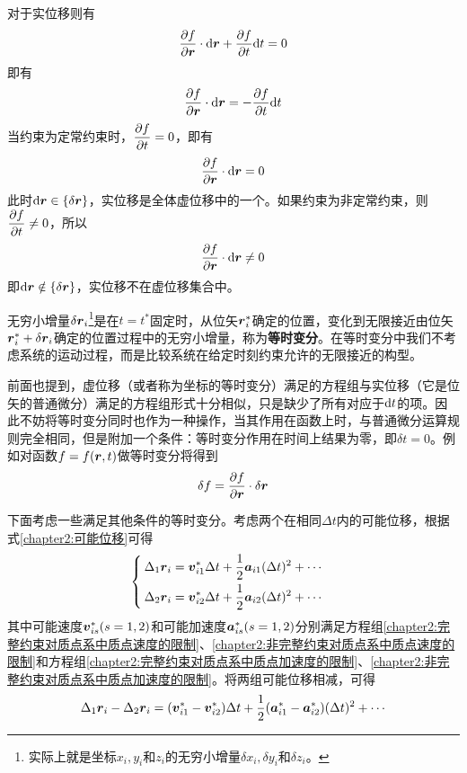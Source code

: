 \begin{example}
对于实位移则有
\begin{equation*}
	\frac{\partial f}{\partial \boldsymbol{r}} \cdot \mathrm{d}\boldsymbol{r} + \frac{\partial f}{\partial t} \mathrm{d} t = 0
\end{equation*}
即有
\begin{equation*}
	\frac{\partial f}{\partial \boldsymbol{r}} \cdot \mathrm{d} \boldsymbol{r} = - \frac{\partial f}{\partial t} \mathrm{d} t
\end{equation*}
当约束为定常约束时，$\dfrac{\partial f}{\partial t} = 0$，即有
\begin{equation*}
	\frac{\partial f}{\partial \boldsymbol{r}} \cdot \mathrm{d} \boldsymbol{r} = 0
\end{equation*}
此时$\mathrm{d} \boldsymbol{r} \in \{\delta \boldsymbol{r}\}$，实位移是全体虚位移中的一个。如果约束为非定常约束，则$\dfrac{\partial f}{\partial t} \neq 0$，所以
\begin{equation*}
	\frac{\partial f}{\partial \boldsymbol{r}} \cdot \mathrm{d} \boldsymbol{r} \neq 0
\end{equation*}
即$\mathrm{d} \boldsymbol{r} \notin \{\delta \boldsymbol{r}\}$，实位移不在虚位移集合中。
\end{example}

无穷小增量$\delta \boldsymbol{r}_i$\footnote{实际上就是坐标$x_i,y_i$和$z_i$的无穷小增量$\delta x_i,\delta y_i$和$\delta z_i$。}是在$t=t^*$固定时，从位矢$\boldsymbol{r}_i^*$确定的位置，变化到无限接近由位矢$\boldsymbol{r}_i^*+\delta \boldsymbol{r}_i$确定的位置过程中的无穷小增量，称为{\bf 等时变分}。在等时变分中我们不考虑系统的运动过程，而是比较系统在给定时刻约束允许的无限接近的构型。

前面也提到，虚位移（或者称为坐标的等时变分）满足的方程组与实位移（它是位矢的普通微分）满足的方程组形式十分相似，只是缺少了所有对应于$\mathrm{d} t$的项。因此不妨将等时变分同时也作为一种操作，当其作用在函数上时，与普通微分运算规则完全相同，但是附加一个条件：等时变分作用在时间上结果为零，即$\delta t=0$。例如对函数$f=f(\boldsymbol{r},t)$做等时变分将得到
\begin{equation*}
	\delta f = \frac{\partial f}{\partial \boldsymbol{r}}\cdot \delta \boldsymbol{r}
\end{equation*}

下面考虑一些满足其他条件的等时变分。考虑两个在相同$\Delta t$内的可能位移，根据式\eqref{chapter2:可能位移}可得
\begin{equation*}
\begin{cases}
	\displaystyle \Delta_1\boldsymbol{r}_i = \boldsymbol{v}_{i1}^*\Delta t+\frac12 \boldsymbol{a}_{i1}(\Delta t)^2+\cdots \\[1.5ex]
	\displaystyle \Delta_2\boldsymbol{r}_i = \boldsymbol{v}_{i2}^*\Delta t+\frac12 \boldsymbol{a}_{i2}(\Delta t)^2+\cdots 
\end{cases}
\end{equation*}
其中可能速度$\boldsymbol{v}_{is}^*(s=1,2)$和可能加速度$\boldsymbol{a}_{is}^*(s=1,2)$分别满足方程组\eqref{chapter2:完整约束对质点系中质点速度的限制}、\eqref{chapter2:非完整约束对质点系中质点速度的限制}和方程组\eqref{chapter2:完整约束对质点系中质点加速度的限制}、\eqref{chapter2:非完整约束对质点系中质点加速度的限制}。将两组可能位移相减，可得
\begin{equation}
	\Delta_1\mbf{r}_i-\Delta_2\mbf{r}_i = (\mbf{v}_{i1}^*-\mbf{v}_{i2}^*)\Delta t + \frac12 (\mbf{a}_{i1}^*-\mbf{a}_{i2}^*)(\Delta t)^2+\cdots
	\label{chapter2:其他形式的等时变分}
\end{equation}


